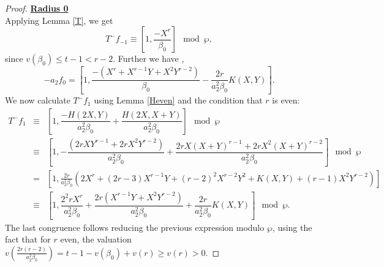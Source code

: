 \documentclass[11pt, reqno]{amsart}
\numberwithin{equation}{section}
\theoremstyle{definition}
\theoremstyle{remark}
\theoremstyle{definition}
\theoremstyle{remark}
\theoremstyle{remark}
\begin{document}
\begin{proof}
\noindent\underline{\textbf{Radius 0}}\\
 Applying Lemma \ref{T}, we get %
\begin{equation}\label{F2'T-f-1}
    T^{-}f_{-1} \equiv 
        \left[1, \dfrac{-X^r}{\beta_{0}}\right]\mod\wp,
\end{equation}
since $v(\beta_0)\leq t-1<r-2$.
Further we have ,
\begin{equation}\label{F2'a2f0}
 -a_{2}f_{0} = \left[1, \dfrac{-\left(X^{r}+X^{r-1}Y+X^{2}Y^{r-2}\right)}{\beta_{0}} -\dfrac{2r}{a_{2}^2\beta_{0}}K(X,Y) \right].
 \end{equation}
We now calculate $T^{-}f_{1}$ using Lemma \ref{Heven} and the condition that $r$ is even:
\begin{eqnarray}\label{F2'T-f1}      T^{-}f_1 &\equiv& \left[1, \dfrac{-H(2X,Y)}{a_{2}^2\beta_{0}}+\dfrac{H(2X,X+Y)}{a_{2}^2\beta_{0}}\right] \mod \wp \nonumber\\
    &\equiv&  \left[1, -\dfrac{(2rXY^{r-1}+2r    X^{2}Y^{r-2})}{a_{2}^2\beta_{0}}+\dfrac{2rX(X+Y)^{r-1}+2rX^{2}(X+Y)^{r-2}} {a_{2}^2\beta_{0}}\right]\mod\wp \nonumber\\
    &=&\left[1, \frac{2r}{a_2^2\beta_0}\left(2X^r+(2r-3)X^{r-1}Y+(r-2)^2X^{r-2}Y^2+K(X,Y)+(r-1)X^2Y^{r-2}\right)\right] \nonumber\\
    &\equiv&\left[1, \dfrac{2^2rX^r}{a_{2}^2\beta_{0}} + \dfrac{2r(X^{r-1}Y+X^{2}Y^{r-2})}{a_{2}^2\beta_{0}}+\dfrac{2r}{a_{2}^2\beta_{0}}K(X,Y)\right]\mod\wp.
\end{eqnarray}
The last congruence follows reducing the previous expression modulo $\wp$, using the fact that for $r$ even, the valuation $v\left(\frac{2r(r-2)}{a_2^2\beta_0}\right)= t-1-v(\beta_0)+v(r)\geq v(r)>0$.



 


\end{proof}
\end{document}
